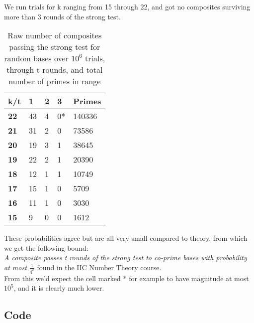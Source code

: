 \documentclass[10pt,a4paper]{report}
\begin{document}
We run trials for k ranging from 15 through 22, and got no composites surviving more than 3 rounds of the strong test.

\begin{table}[h]
\centering
\begin{tabular}{|l|l|l|l|l|}
\hline
\textbf{k/t} & \textbf{1} & \textbf{2} & \textbf{3} & \textbf{Primes} \\ \hline
\textbf{22}  & 43  & 4   & 0*   & 140336                    \\ \hline
\textbf{21}  & 31   & 2    & 0    & 73586                     \\ \hline
\textbf{20}  & 19   & 3    & 1    & 38645                     \\ \hline
\textbf{19}  & 22   & 2    & 1   & 20390                     \\ \hline
\textbf{18}  & 12   & 1  & 1    & 10749                     \\ \hline
\textbf{17}  & 15    & 1     & 0     & 5709                      \\ \hline
\textbf{16}  & 11    & 1     & 0     & 3030                      \\ \hline
\textbf{15}  & 9    & 0    & 0     & 1612                      \\ \hline
\end{tabular}
\caption{Raw number of composites passing the strong test for random bases over $10^6$ trials, through t rounds, and total number of primes in range}
\end{table}

These probabilities agree but are all very small compared to theory, from which we get the following bound: \\

\textit{A composite passes t rounds of the strong test to co-prime bases with probability at most $\frac{1}{4^k}$} found in the IIC Number Theory course.\\

From this we'd expect the cell marked * for example to have magnitude at most $10^5$, and it is clearly much lower.

\newpage

\subsection*{Code}
\end{document}
